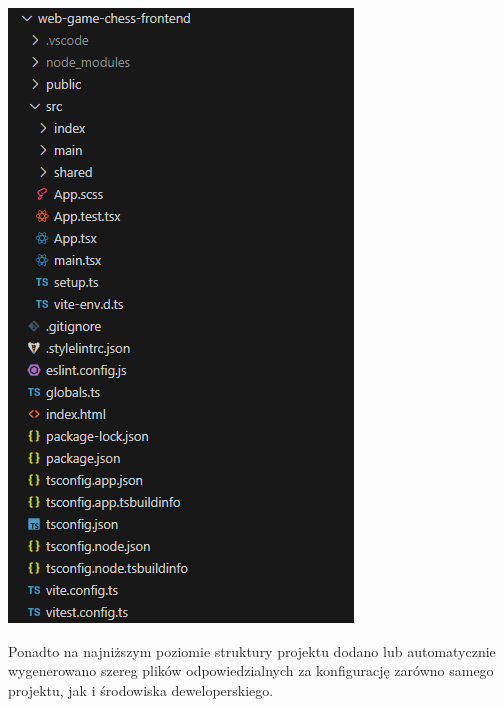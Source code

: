 \documentclass[twoside]{projektInzynierskiMS1}
\begin{document}
\begin{minipage}[t]{0.45\textwidth} 
    \vspace{0pt} 
    \centering 
    \includegraphics[width=\linewidth]{images/struktura_front.png}
\end{minipage}
\vspace{0.5cm}

\noindent
Ponadto na najniższym poziomie struktury projektu dodano lub automatycznie wygenerowano szereg plików odpowiedzialnych za konfigurację zarówno samego projektu, jak i środowiska deweloperskiego.
\end{document}
